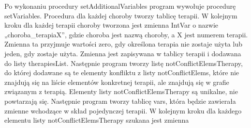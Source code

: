 Po wykonaniu procedury setAdditionalVariables program wywołuje procedurę setVariables. 
Procedura dla każdej choroby tworzy tablicę terapii. W kolejnym kroku dla każdej terapii choroby tworzona jest zmienna IntVar 
o nazwie „choroba\_terapiaX”, gdzie choroba jest nazwą choroby, a X jest numerem terapii. Zmienna ta przyjmuje wartości zero, gdy  określona terapia nie zostaje użyta lub jeden, gdy zostaje użyta. Zmienna jest zapisywana w tablicy terapii i dodawana do listy therapiesList. 
Następnie program tworzy listę notConflictElemsTherapy, do której dodawane są te elementy konfliktu z listy notConflictElems, które nie znajdują się na liście elementów konkretnej terapii, ale znajdują się w grafie związanym z terapią. Elementy listy notConflictElemsTherapy są unikalne, nie powtarzają się. Następnie program tworzy tablicę vars, która będzie zawierała zmienne wchodzące w skład pojedynczej terapii. W kolejnym kroku dla każdego elementu listy notConflictElemsTherapy szukana jest zmienna 
